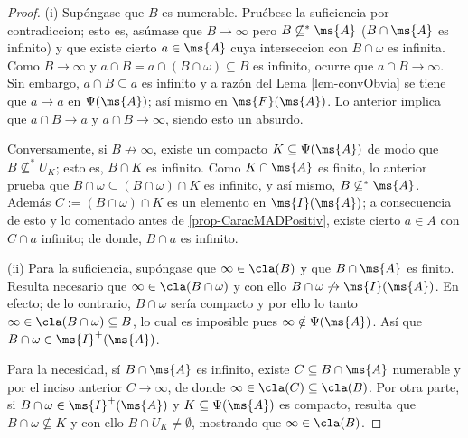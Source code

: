	\begin{proof} 
		(i) Supóngase que $B$ es numerable. Pruébese la suficiencia por contradiccion; esto es, asúmase que $B \to \infty$ pero $B \not\subseteq^* \ms{A}$ ($B\cap \ms{A}$ es infinito) y que existe cierto $a \in \ms{A}$ cuya interseccion con $B \cap \omega$ es infinita. Como $B\to \infty$ y $a \cap B = a \cap (B \cap \omega) \subseteq B$ es infinito, ocurre que $a \cap B \to \infty$. Sin embargo, $a \cap B \subseteq a$ es infinito y a razón del Lema \ref{lem-convObvia} se tiene que $a \to a$ en $\Psi(\ms{A})$; así mismo en $\ms{F}(\ms{A})$. Lo anterior implica que $a \cap B \to a$ y $a \cap B \to \infty$, siendo esto un absurdo.

		Conversamente, si $B \not\to \infty$, existe un compacto $K \subseteq \Psi(\ms{A})$ de modo que $B \not\subseteq^* U_K$; esto es, $B \cap K$ es infinito. Como $K \cap \ms{A}$ es finito, lo anterior prueba que $B \cap \omega \subseteq (B \cap \omega) \cap K$ es infinito, y así mismo, $B \not\subseteq^* \ms{A}$. Además $C:=(B \cap \omega) \cap K$ es un elemento en $\ms{I}(\ms{A})$; a consecuencia de esto y lo comentado antes de \ref{prop-CaracMADPositiv}, existe cierto $a \in A$ con $C \cap a$ infinito; de donde, $B \cap a$ es infinito.
		
		(ii) Para la suficiencia, supóngase que $\infty \in \cla(B)$ y que $B \cap \ms{A}$ es finito. Resulta necesario que $\infty \in \cla(B \cap \omega)$ y con ello $B \cap \omega \not\to \ms{I}(\ms{A})$. En efecto; de lo contrario, $B \cap \omega$ sería compacto y por ello lo tanto $\infty \in \cla(B \cap \omega) \subseteq B$, lo cual es imposible pues $\infty \notin \Psi(\ms{A})$. Así que $B \cap \omega \in \ms{I}^+(\ms{A})$.

		Para la necesidad, sí $B \cap \ms{A}$ es infinito, existe $C \subseteq B \cap \ms{A}$ numerable y por el inciso anterior $C \to \infty$, de donde $\infty \in \cla(C) \subseteq \cla(B)$. Por otra parte, si $B \cap \omega \in \ms{I}^+(\ms{A})$ y $K \subseteq \Psi(\ms{A})$ es compacto, resulta que $B \cap \omega \not\subseteq K$ y con ello $B\cap U_K \neq \emptyset$, mostrando que $\infty \in \cla(B)$.
	\end{proof}


